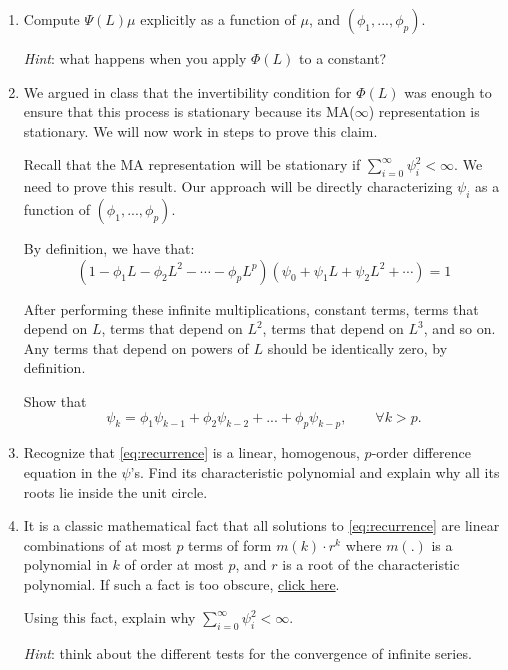 \documentclass[11pt]{article}
\theoremstyle{definition}
\begin{document}
\begin{enumerate}
	\item Compute $\Psi(L)\mu$ explicitly as a function of $\mu$, and $(\phi_1, ..., \phi_p)$.
	
	\textit{Hint}: what happens when you apply $\Phi(L)$ to a constant?

	\item We argued in class that the invertibility condition for $\Phi(L)$ was enough to ensure that this process is stationary because its MA($\infty$) representation is stationary. We will now work in steps to prove this claim. 
	
	Recall that the MA representation will be stationary if $\sum\limits_{i=0}^{\infty}\psi_i^2 < \infty$. We need to prove this result. Our approach will be directly characterizing $\psi_i$ as a function of $(\phi_1, ..., \phi_p)$.

	By definition, we have that:
	\begin{equation*}
		(1 - \phi_1 L - \phi_2 L^2 - \cdots - \phi_p L^p)(\psi_0 + \psi_1 L + \psi_2 L^2 + \cdots) = 1
	\end{equation*}

	After performing these infinite multiplications, constant terms, terms that depend on $L$, terms that depend on $L^2$, terms that depend on $L^3$, and so on. Any terms that depend on powers of $L$ should be identically zero, by definition.

	Show that 
	\begin{equation}
		\label{eq:recurrence}
		\psi_k = \phi_1 \psi_{k-1} + \phi_2 \psi_{k-2} + ... + \phi_p \psi_{k-p}, \qquad \forall k > p.
	\end{equation}

	\item Recognize that \eqref{eq:recurrence} is a linear, homogenous, $p$-order difference equation in the $\psi$'s. Find its characteristic polynomial and explain why all its roots lie inside the unit circle.
	
	\item It is a classic mathematical fact that all solutions to \eqref{eq:recurrence} are linear combinations of at most $p$ terms of form $m(k)\cdot r^k$ where $m(.)$ is a polynomial in $k$ of order at most $p$, and $r$ is a root of the characteristic polynomial. If such a fact is too obscure, \href{https://wwz.unibas.ch/fileadmin/user_upload/wwz/00_Professuren/Kleiber_Oekonometrie_und_Statistik/Downloads/Topics/Skript008_DifferenceEquations.pdf}{click here}.
	
	Using this fact, explain why $\sum\limits_{i=0}^{\infty}\psi_i^2 < \infty$. 
	
	\emph{Hint}: think about the different tests for the convergence of infinite series.
\end{enumerate}
\end{document}
